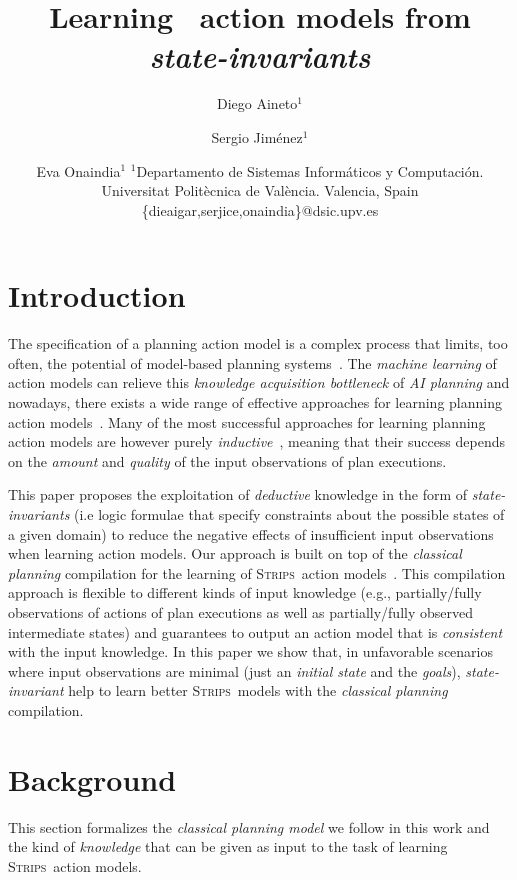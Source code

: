 \documentclass{article}
\title{Learning \strips\ action models from {\em state-invariants}}
\author{
Diego Aineto$^1$\and
Sergio Jim\'enez$^1$\and
Eva Onaindia$^1$
\affiliations
$^1${\small Departamento de Sistemas Inform\'aticos y Computaci\'on. Universitat Polit\`ecnica de Val\`encia. Valencia, Spain}
\emails
{\scriptsize \{dieaigar,serjice,onaindia\}@dsic.upv.es}}
\newcommand{\strips}{\textsc{Strips}}
\begin{document}
\maketitle


\begin{abstract}
\end{abstract}

\section{Introduction}
\label{sec:introduction}

The specification of a planning action model is a complex process that limits, too often, the potential of model-based planning systems~\cite{kambhampati:modellite:AAAI2007}. The {\em machine learning} of action models can relieve this {\em knowledge acquisition bottleneck} of {\em AI planning} and nowadays, there exists a wide range of effective approaches for learning planning action models~\cite{arora:amodels:ker2018}. Many of the most successful approaches for learning planning action models are however purely {\em inductive}~\cite{yang2007learning,pasula2007learning,mourao2010learning,zhuo2013action}, meaning that their success depends on the {\em amount} and {\em quality} of the input observations of plan executions. 

This paper proposes the exploitation of {\em deductive} knowledge in the form of {\em state-invariants} (i.e logic formulae that specify constraints about the possible states of a given domain) to reduce the negative effects of insufficient input observations when learning action models. Our approach is built on top of the {\em classical planning} compilation for the learning of \strips\ action models~\cite{aineto2018learning}. This compilation approach is flexible to different kinds of input knowledge (e.g., partially/fully observations of actions of plan executions as well as partially/fully observed intermediate states) and guarantees to output an action model that is {\em consistent} with the input knowledge. In this paper we show that, in unfavorable scenarios where input observations are minimal (just an {\em initial state} and the {\em goals}), {\em state-invariant} help to learn better \strips\ models with the {\em classical planning} compilation. 





\section{Background}
\label{sec:background}
This section formalizes the {\em classical planning model} we follow in this work and the kind of {\em knowledge} that can be given as input to the task of learning \strips\ action models.  
\end{document}
